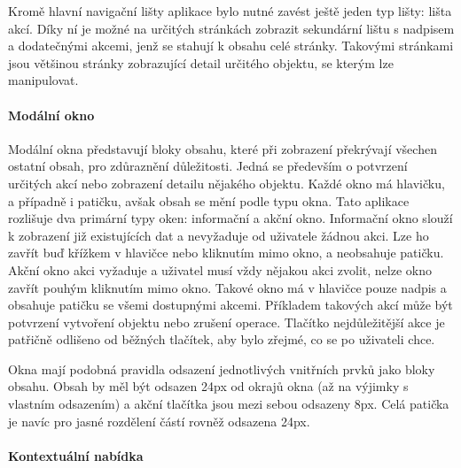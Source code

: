 			Kromě hlavní navigační lišty aplikace bylo nutné zavést ještě jeden typ lišty: lišta akcí.
			Díky ní je možné na určitých stránkách zobrazit sekundární lištu s nadpisem a dodatečnými akcemi, jenž se stahují
			k obsahu celé stránky.
			Takovými stránkami jsou většinou stránky zobrazující detail určitého objektu, se kterým lze manipulovat.


			\paragraph{Modální okno}

			Modální okna představují bloky obsahu, které při zobrazení překrývají všechen ostatní obsah, pro zdůraznění
			důležitosti.
			Jedná se především o potvrzení určitých akcí nebo zobrazení detailu nějakého objektu.
			Každé okno má hlavičku, a případně i patičku, avšak obsah se mění podle typu okna.
			Tato aplikace rozlišuje dva primární typy oken: informační a akční okno.
			Informační okno slouží k zobrazení již existujících dat a nevyžaduje od uživatele žádnou akci.
			Lze ho zavřít buď křížkem v hlavičce nebo kliknutím mimo okno, a neobsahuje patičku.
			Akční okno akci vyžaduje a uživatel musí vždy nějakou akci zvolit, nelze okno zavřít pouhým kliknutím mimo okno.
			Takové okno má v hlavičce pouze nadpis a obsahuje patičku se všemi dostupnými akcemi.
			Příkladem takových akcí může být potvrzení vytvoření objektu nebo zrušení operace.
			Tlačítko nejdůležitější akce je patřičně odlišeno od běžných tlačítek, aby bylo zřejmé, co se po
			uživateli chce.

			Okna mají podobná pravidla odsazení jednotlivých vnitřních prvků jako bloky obsahu.
			Obsah by měl být odsazen 24px od okrajů okna (až na výjimky s vlastním odsazením) a akční tlačítka jsou
			mezi sebou odsazeny 8px.
			Celá patička je navíc pro jasné rozdělení částí rovněž odsazena 24px.



			\paragraph{Kontextuální nabídka}

